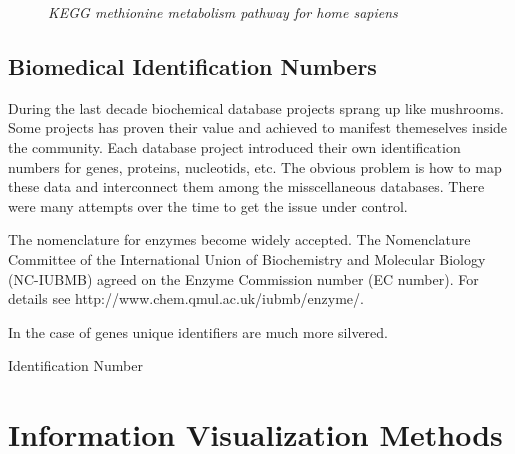 \begin{figure}[ht]
\centering
{} 
\caption[KEGG methionine metabolism pathway for home sapiens]{\textit{KEGG methionine metabolism pathway for home sapiens}} 
\label{gfx:KEGG_methionine_metabolism_271_pathway_hsa}
\end{figure}

\subsection{Biomedical Identification Numbers}

During the last decade biochemical database projects sprang up like mushrooms. Some projects has proven their value and achieved to manifest themeselves inside the community. Each database project introduced their own identification numbers for genes, proteins, nucleotids, etc. The obvious problem is how to map these data and interconnect them among the misscellaneous databases. 
There were many attempts over the time to get the issue under control.

The nomenclature for enzymes become widely accepted. The Nomenclature Committee of the International Union of Biochemistry and Molecular Biology (NC-IUBMB) agreed on the Enzyme Commission number (EC number). For details see http://www.chem.qmul.ac.uk/iubmb/enzyme/.

In the case of genes unique identifiers are much more silvered.

Identification Number

\section{Information Visualization Methods}

